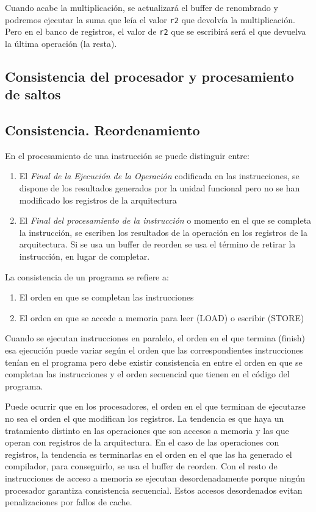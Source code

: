 \documentclass[10pt,a4paper,spanish]{report}
\begin{document}
Cuando acabe la multiplicación, se actualizará el buffer de renombrado y podremos ejecutar la suma que leía el valor \verb*|r2| que devolvía la multiplicación. Pero en el banco de registros, el valor de \verb*|r2| que se escribirá será el que devuelva la última operación (la resta).

\textcolor{azul}{\section{Consistencia del procesador y procesamiento de saltos}}
\textcolor{azul}{\subsection{Consistencia. Reordenamiento}}
En el procesamiento de una instrucción se puede distinguir entre:
\begin{enumerate}[\color{azul}{$\heartsuit$}]
    \item El \textit{\textcolor{azul}{Final de la Ejecución de la Operación}} codificada en las instrucciones, se dispone de los resultados generados por la unidad funcional pero no se han modificado los registros de la arquitectura
    \item El \textit{\textcolor{azul}{Final del procesamiento de la instrucción}} o momento en el que se completa la instrucción, se escriben los resultados de la operación en los registros de la arquitectura. Si se usa un buffer de reorden se usa el término de retirar la instrucción, en lugar de completar.
\end{enumerate}

La consistencia de un programa se refiere a:
\begin{enumerate}[\color{azul}{$\heartsuit$}]
    \item El orden en que se completan las instrucciones
    \item El orden en que se accede a memoria para leer (LOAD) o escribir (STORE)
\end{enumerate}

Cuando se ejecutan instrucciones en paralelo, el orden en el que termina (finish) esa ejecución puede variar según el orden que las correspondientes instrucciones tenían en el programa pero debe existir consistencia en entre el orden en que se completan las instrucciones y el orden secuencial que tienen en el código del programa.

Puede ocurrir que en los procesadores, el orden en el que terminan de ejecutarse no sea el orden el que modifican los registros. La tendencia es que haya un tratamiento distinto en las operaciones que son accesos a memoria y las que operan con registros de la arquitectura. En el caso de las operaciones con registros, la tendencia es terminarlas en el orden en el que las ha generado el compilador, para conseguirlo, se usa el buffer de reorden. Con el resto de instrucciones de acceso a memoria se ejecutan desordenadamente porque ningún procesador garantiza consistencia secuencial. Estos accesos desordenados evitan penalizaciones por fallos de cache.
\end{document}
